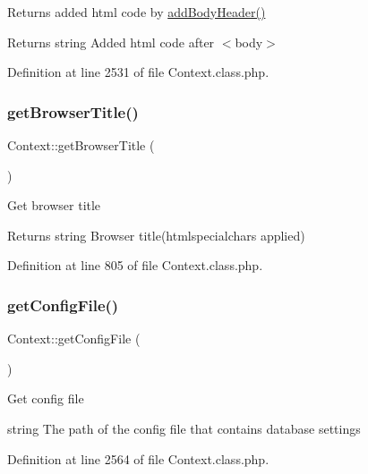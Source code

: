 Returns added html code by \hyperlink{classContext_ae7c9dad9ccd3e410283e21c67f395114}{add\+Body\+Header()}

\begin{DoxyReturn}{Returns}
string Added html code after $<$body$>$ 
\end{DoxyReturn}


Definition at line 2531 of file Context.\+class.\+php.

\mbox{\label{classContext_a19f432349a41af2ed36b2cd5e6ba96a5}} 
\subsubsection{\texorpdfstring{get\+Browser\+Title()}{getBrowserTitle()}}
{\footnotesize\ttfamily Context\+::get\+Browser\+Title (\begin{DoxyParamCaption}{ }\end{DoxyParamCaption})}

Get browser title

\begin{DoxyReturn}{Returns}
string Browser title(htmlspecialchars applied) 
\end{DoxyReturn}


Definition at line 805 of file Context.\+class.\+php.

\mbox{\label{classContext_a7ac0928e07cfc7f19f9a7341c50b4811}} 
\subsubsection{\texorpdfstring{get\+Config\+File()}{getConfigFile()}}
{\footnotesize\ttfamily Context\+::get\+Config\+File (\begin{DoxyParamCaption}{ }\end{DoxyParamCaption})}

Get config file

string The path of the config file that contains database settings 

Definition at line 2564 of file Context.\+class.\+php.

\mbox{\label{classContext_a1b14cb135e24cc9c79414a50575cf309}} 
